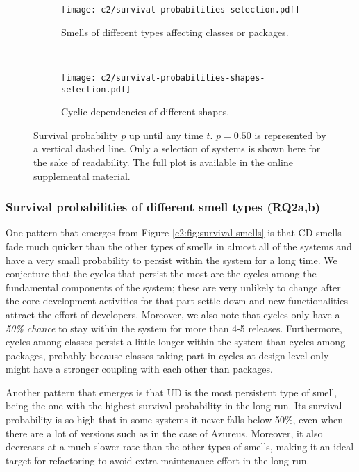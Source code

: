 \begin{figure}[!ht]
	\centering
    \begin{subfigure}[]{.7\textwidth}
        \centering
        \texttt{[image: c2/survival-probabilities-selection.pdf]}
        \caption{Smells of different types affecting classes or packages.}
        \label{c2:fig:surival-smells} 
    \end{subfigure} \hfill \\
    \begin{subfigure}[]{.7\textwidth}
        \centering
        \texttt{[image: c2/survival-probabilities-shapes-selection.pdf]}
        \caption{Cyclic dependencies of different shapes.}
        \label{c2:fig:survival-shapes} 
    \end{subfigure}
    \caption{Survival probability $p$ up until any time $t$. $p = 0.50$ is represented by a vertical dashed line. Only a selection of systems is shown here for the sake of readability. The full plot is available in the online supplemental material.}
    \label{c2:fig:survival}
\end{figure}

\subsubsection{Survival probabilities of different smell types (RQ2a,b)}
One pattern that emerges from Figure \ref{c2:fig:survival-smells} is that CD smells fade much quicker than the other types of smells in almost all of the systems and have a very small probability to persist within the system for a long time.
We conjecture that the cycles that persist the most are the cycles among the fundamental components of the system; these are very unlikely to change after the core development activities for that part settle down and new functionalities attract the effort of developers.
Moreover, we also note that cycles only have a \emph{50\% chance} to stay within the system for more than 4-5 releases. Furthermore, cycles among classes persist a little longer within the system than cycles among packages, probably because classes taking part in cycles at design level only might have a stronger coupling with each other than packages.

Another pattern that emerges is that UD is the most persistent type of smell, being the one with the highest survival probability in the long run.
Its survival probability is so high that in some systems it never falls below 50\%, even when there are a lot of versions such as in the case of Azureus.
Moreover, it also decreases at a much slower rate than the other types of smells, making it an ideal target for refactoring to avoid extra maintenance effort in the long run.

